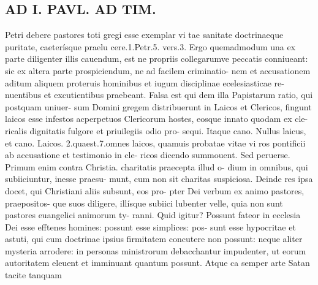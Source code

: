 \documentclass{article}
\begin{document}
\begin{pages}
\section*{AD I. PAVL. AD TIM. }
\marginpar{[ p.312 ]}Petri debere pastores toti gregi esse exemplar vi tae sanitate doctrinaeque puritate, caeterísque praelu cere.1.Petr.5. vers.3. Ergo quemadmodum una ex parte diligenter illis cauendum, est ne propriis collegarumve peccatis conniueant: sic ex altera parte prospiciendum, ne ad facilem criminatio- nem et accusationem aditum aliquem proteruis hominibus et iugum disciplinae ecelesiasticae re- nuentibus et excutientibus praebeant. Falsa est qui dem illa Papistarum ratio, qui postquam uniuer- sum Domini gregem distribuerunt in Laicos et Clericos, fingunt laicos esse infestos acperpetuos Clericorum hostes, eosque innato quodam ex cle- ricalis dignitatis fulgore et priuilegiis odio pro- sequi. Itaque cano. Nullus laicus, et cano. Laicos. 2.quaest.7.omnes laicos, quamuis probatae vitae vi ros pontificii ab accusatione et testimonio in cle- ricos dicendo summouent. Sed peruerse. Primum enim contra Christia. charitatis praecepta illud o- dium in omnibus, qui subiiciuntur, inesse praesu- munt, cum non sit charitas suspiciosa. Deinde res ipsa docet, qui Christiani aliis subsunt, eos pro- pter Dei verbum ex animo pastores, praepositos- que suos diligere, illísque subiici lubenter velle, quia non sunt pastores euangelici animorum ty- ranni. Quid igitur? Possunt fateor in ecclesia Dei esse efftenes homines: possunt esse simplices: pos- sunt esse hypocritae et astuti, qui cum doctrinae ipsius firmitatem concutere non possunt: neque aliter mysteria arrodere: in personas ministrorum debacchantur impudenter, ut eorum autoritatem eleuent et imminuant quantum possunt. Atque ca semper arte Satan tacite tanquam 

\end{pages}
\end{document}
